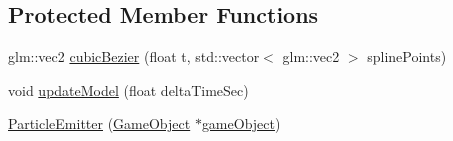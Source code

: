 \subsection*{Protected Member Functions}
\begin{DoxyCompactItemize}
\item 
glm\+::vec2 \hyperlink{class_mason_1_1_particle_emitter_a9750a2b4f2f644691822b266359f1c86}{cubic\+Bezier} (float t, std\+::vector$<$ glm\+::vec2 $>$ spline\+Points)
\item 
void \hyperlink{class_mason_1_1_particle_emitter_abc43ce83f1adef05e78b166422217cad}{update\+Model} (float delta\+Time\+Sec)
\item 
\hyperlink{class_mason_1_1_particle_emitter_a30525758eaab5f41e625b8354e80d219}{Particle\+Emitter} (\hyperlink{class_mason_1_1_game_object}{Game\+Object} $\ast$\hyperlink{class_mason_1_1_component_a30030370c35f5562cbbbb0927b0448c8}{game\+Object})
\end{DoxyCompactItemize}
